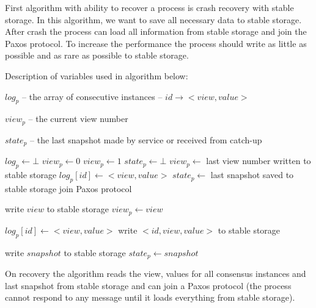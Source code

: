 First algorithm with ability to recover a process is crash recovery with stable storage. In this algorithm, we want to save all necessary data to stable storage. After crash the process can load all information from stable storage and join the Paxos protocol. To increase the performance the process should write as little as possible and as rare as possible to stable storage.

Description of variables used in algorithm below:
\begin{tightList}[\setlength{\labelwidth}{20em} \setlength{\leftmargin}{2\leftmargin}]
  \item[$log_p$] -- the array of consecutive instances -- $id \rightarrow <view, value>$
  \item[$view_p$] -- the current view number
  \item[$state_p$] -- the last snapshot made by service or received from catch-up
\end{tightList}

\begin{algorithmic}[1]
  \INIT{}
    \STATE $log_p \leftarrow \bot$ %
    \STATE $view_p \leftarrow 0$
      \STATE $view_p \leftarrow 1$
    \ENDIF
    \STATE $state_p \leftarrow \bot$ %
    \STATE
      \STATE $view_p \leftarrow$ last view number written to stable storage
        \STATE $log_p[id] \leftarrow <view, value>$
      \ENDFOR
      \STATE $state_p \leftarrow$ last snapshot saved to stable storage
    \ENDIF
    \STATE
    \STATE join Paxos protocol
  \ENDINIT

  \vspace{1em}
    \STATE write $view$ to stable storage
    \STATE $view_p \leftarrow view$
  \ENDPROC

  \vspace{1em}
    \STATE $log_p[id] \leftarrow <view, value>$
    \STATE write $<id, view, value>$ to stable storage
  \ENDPROC

  \vspace{1em}
    \STATE write $snapshot$ to stable storage
    \STATE $state_p \leftarrow snapshot$ 
  \ENDPROC
\end{algorithmic}

On recovery the algorithm reads the view, values for all consensus instances and last snapshot from stable storage and can join a Paxos protocol (the process cannot respond to any message until it loads everything from stable storage).

